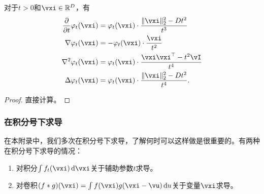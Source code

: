 \documentclass[../../book-main.tex]{subfiles}
\begin{document}
\begin{proposition}\label{prop:normal_derivatives}
    对于\(t > 0\)和\(\vxi \in \R^{D}\)，有
    \begin{align}
        \pdv*{\phi_{t}}{t}(\vxi)
        &= \phi_{t}(\vxi) \cdot \frac{\norm{\vxi}_{2}^{2} - Dt^{2}}{t^{3}} \\
        \nabla \phi_{t}(\vxi)
        &= -\phi_{t}(\vxi)\cdot\frac{\vxi}{t^{2}} \\ 
        \nabla^{2} \phi_{t}(\vxi)
        &= \phi_{t}(\vxi)\cdot\frac{\vxi\vxi^{\top} - t^{2}\vI}{t^{4}} \\
        \Delta \phi_{t}(\vxi)
        &= \phi_{t}(\vxi) \cdot \frac{\norm{\vxi}_{2}^{2} - Dt^{2}}{t^{4}}.
    \end{align}
\end{proposition}
\begin{proof}
    直接计算。
\end{proof}



\subsubsection{在积分号下求导}

在本附录中，我们多次在积分号下求导，了解何时可以这样做是很重要的。有两种在积分号下求导的情况：
\begin{enumerate}
    \item 对积分\(\int f_{t}(\vxi)\odif{\vxi}\)关于辅助参数\(t\)求导。
    \item 对卷积\((f * g)(\vxi) = \int f(\vxi)g(\vxi - \vu)\odif{u}\)关于变量\(\vxi\)求导。
\end{enumerate}
\end{document}
